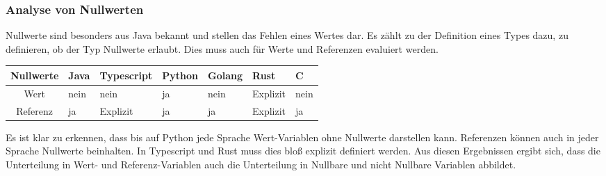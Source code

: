 \documentclass[./einleitung.tex]{subfiles}
\begin{document}
    \subsubsection{Analyse von Nullwerten}
    Nullwerte sind besonders aus Java bekannt und stellen das Fehlen eines Wertes dar.
    Es zählt zu der Definition eines Types dazu, zu definieren, ob der Typ Nullwerte erlaubt.
    Dies muss auch für Werte und Referenzen evaluiert werden.
    \begin{center}
        \begin{tabular}{| c || m{4em} | m{5em} | m{5em} | m{4.5em} | m{4.5em} | m{4.5em} |}
            \hline
            Nullwerte & Java & Typescript & Python & Golang & Rust     & C    \\
            \hline
            Wert      & nein & nein       & ja     & nein   & Explizit & nein \\
            \hline
            Referenz  & ja   & Explizit   & ja     & ja     & Explizit & ja   \\
            \hline
        \end{tabular}
    \end{center}
    Es ist klar zu erkennen, dass bis auf Python jede Sprache Wert-Variablen ohne Nullwerte darstellen kann.
    Referenzen können auch in jeder Sprache Nullwerte beinhalten.
    In Typescript und Rust muss dies bloß explizit definiert werden.
    Aus diesen Ergebnissen ergibt sich, dass die Unterteilung in Wert- und Referenz-Variablen auch die Unterteilung in Nullbare und nicht Nullbare Variablen abbildet.
\end{document}
